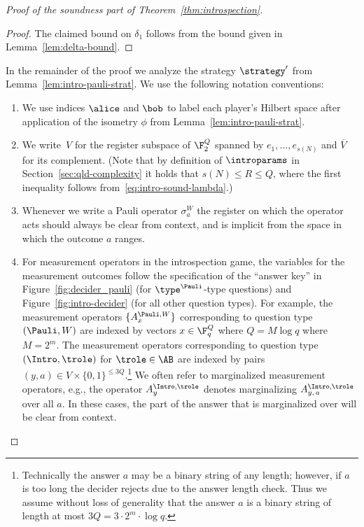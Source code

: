 \begin{proof}[Proof of the soundness part of Theorem~\ref{thm:introspection}]
\begin{proof}
    The claimed bound on $\delta_1$ follows from the bound given in
    Lemma~\ref{lem:delta-bound}.
  \end{proof}
	
  In the remainder of the proof we analyze the strategy $\strategy'$ from
  Lemma~\ref{lem:intro-pauli-strat}.
  We use the following notation conventions:
  \begin{enumerate}
  \item We use indices $\alice$ and $\bob$ to label each player's Hilbert space
    after application of the isometry $\phi$ from
    Lemma~\ref{lem:intro-pauli-strat}.

  \item We write~$V$ for the register subspace of $\F_2^{Q}$ spanned by $e_1,
    \ldots, e_{s(N)}$ and $\overline{V}$ for its complement.
    (Note that by definition of $\introparams$ in
    Section~\ref{sec:qld-complexity} it holds that $s(N)\leq R \leq Q$, where
    the first inequality follows from~\eqref{eq:intro-sound-lambda}.)

  \item Whenever we write a Pauli operator $\sigma^W_a$ the register on which
    the operator acts should always be clear from context, and is implicit from
    the space in which the outcome $a$ ranges.
  
  \item For measurement operators in the introspection game, the variables for
    the measurement outcomes follow the specification of the ``answer key'' in
    Figure~\ref{fig:decider_pauli} (for $\type^\Pauli$-type questions) and
    Figure~\ref{fig:intro-decider} (for all other question types).
    For example, the measurement operators $\{A_x^{\Pauli,W} \}$ corresponding
    to question type $(\Pauli,W)$ are indexed by vectors $x \in \F_q^Q$ where $Q
    = M \log q$ where $M = 2^m$.
    The measurement operators corresponding to question type $(\Intro,\trole)$
    for $\trole \in \AB$ are indexed by pairs $(y,a) \in V \times \{0,1\}^{\leq
      3Q}$.\footnote{Technically the answer $a$ may be a binary string of any
      length; however, if $a$ is too long the decider rejects due to the answer
      length check.
      Thus we assume without loss of generality that the answer $a$ is a binary
      string of length at most $3Q = 3\cdot 2^m \cdot \log q$.}
    We often refer to marginalized measurement operators, e.g., the operator
    $A^{\Intro,\trole}_{y}$ denotes marginalizing $A^{\Intro,\trole}_{y,\, a}$ over
    all $a$.
    In these cases, the part of the answer that is marginalized over will be
    clear from context.
		

\end{enumerate}
\end{proof}
